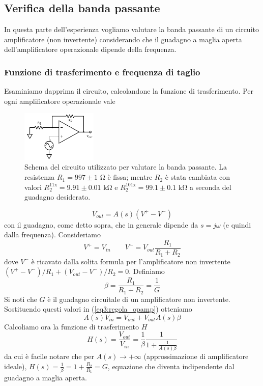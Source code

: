 \subsection{Verifica della banda passante}
\label{par3:bode}

In questa parte dell'esperienza vogliamo valutare la banda passante di un circuito amplificatore (non invertente) considerando che il guadagno a maglia aperta dell'amplificatore operazionale dipende della frequenza.

\subsubsection*{Funzione di trasferimento e frequenza di taglio}

Esaminiamo dapprima il circuito, calcolandone la funzione di trasferimento. Per ogni amplificatore operazionale vale
\begin{figure}
  \begin{center}
    \includegraphics[width=0.32\textwidth]{../E03/latex/bandwidth.pdf}
  \end{center}
  \caption{Schema del circuito utilizzato per valutare la banda passante. La resistenza $R_1=997\pm1$ \si{\ohm} è fissa; mentre $R_2$ è stata cambiata con valori $R_2^{11\mathrm{x}}=9.91 \pm 0.01$ \si{\kilo\ohm} e $R_2^{101\mathrm{x}}=99.1 \pm 0.1$ \si{\kilo\ohm} a seconda del guadagno desiderato.}
  \label{cir3:banda}
\end{figure}
\begin{equation}
V_{out}=A(s) (V^+-V^-)
\label{eq3:regola_opamp}
\end{equation}
con il guadagno, come detto sopra, che in generale dipende da $s=j\omega$ (e quindi dalla frequenza). Consideriamo
$$V^+ = V_{in} \qquad V^-=V_{out} \frac{R_1}{R_1+R_2}$$
dove $V^-$ è ricavato dalla solita formula per l'amplificatore non invertente $(V^+-V^-)/R_1 + (V_{out}-V^-)/R_2 =0$. Definiamo
$$\beta = \frac{R_1}{R_1+R_2} = \frac{1}{G}$$
Si noti che $G$ è il guadagno circuitale di un amplificatore non invertente. Sostituendo questi valori in (\ref{eq3:regola_opamp}) otteniamo
$$A(s) V_{in} = V_{out} + V_{out} A(s) \beta$$
Calcoliamo ora la funzione di trasferimento $H$
\begin{equation}
H(s)=\frac{V_{out}}{V_{in}}=\frac{1}{\beta}\frac{1}{1+\frac{1}{A(s) \beta}}
\label{eq3:funz_trasfe}
\end{equation}
da cui è facile notare che per $A(s) \rightarrow + \infty$ (approssimazione di amplificatore ideale), $H(s)=\frac{1}{\beta}=1+\frac{R_2}{R_1}=G$, equazione che diventa indipendente dal guadagno a maglia aperta.

